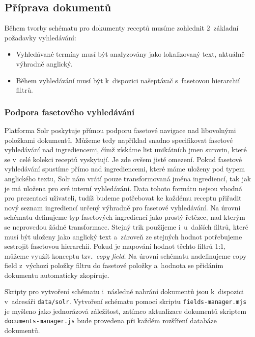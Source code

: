 \subsection{Příprava dokumentů}

Během tvorby schématu pro dokumenty receptů musíme zohlednit $2$~základní požadavky vyhledávání:
\begin{itemize}
    \item Vyhledávané termíny musí být analyzovány jako lokalizovaný text, aktuálně výhradně anglický.
    \item Během vyhledávání musí být k~dispozici našeptávač s~fasetovou hierarchií filtrů.
\end{itemize}

\subsubsection{Podpora fasetového vyhledávání}

Platforma Solr poskytuje přímou podporu fasetové navigace nad libovolnými položkami dokumentů. Můžeme tedy například snadno specifikovat fasetové vyhledávání nad ingrediencemi, čímž získáme list unikátních jmen surovin, které se v~celé kolekci receptů vyskytují. Je zde ovšem jisté omezení. Pokud fasetové vyhledávání spustíme přímo nad ingrediencemi, které máme uloženy pod typem anglického textu, Solr nám vrátí pouze transformovaná jména ingrediencí, tak jak je má uložena pro své interní vyhledávání. Data tohoto formátu nejsou vhodná pro prezentaci uživateli, tudíž budeme potřebovat ke každému receptu přiřadit nový seznam ingrediencí určený výhradně pro fasetové vyhledávání. Na úrovni schématu definujeme typ fasetových ingrediencí jako prostý řetězec, nad kterým se neprovedou žádné transformace. Stejný trik použijeme i~u~dalších filtrů, které musí být uloženy jako anglický text a~zároveň ze stejných hodnot potřebujeme sestrojit fasetovou hierarchii. Pokud je mapování hodnot těchto filtrů $1$:$1$, můžeme využít konceptu tzv.~\emph{copy field}. Na úrovni schématu nadefinujeme copy field z~výchozí položky filtru do fasetové položky a~hodnota se přidáním dokumentu automaticky zkopíruje.

Skripty pro vytvoření schématu i~následné nahrání dokumentů jsou k~dispozici v~adresáři \texttt{data/solr}. Vytvoření schématu pomocí skriptu \texttt{fields-manager.mjs} je myšleno jako jednorázová záležitost, zatímco aktualizace dokumentů skriptem \texttt{documents-manager.js} bude provedena při každém rozšíření databáze dokumentů.

